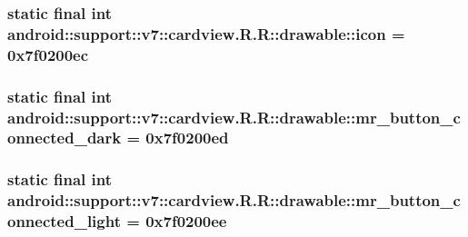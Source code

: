 \hypertarget{classandroid_1_1support_1_1v7_1_1cardview_1_1_r_1_1drawable_9c6ad34a9a64e8ddb2d4bd0702b10056}{
\subsubsection[{icon}]{\setlength{\rightskip}{0pt plus 5cm}static final int android::support::v7::cardview.R.R::drawable::icon = 0x7f0200ec}}
\label{classandroid_1_1support_1_1v7_1_1cardview_1_1_r_1_1drawable_9c6ad34a9a64e8ddb2d4bd0702b10056}


\hypertarget{classandroid_1_1support_1_1v7_1_1cardview_1_1_r_1_1drawable_bc2e2989faf27b8ba32674d74b0dc27a}{
\subsubsection[{mr\_\-button\_\-connected\_\-dark}]{\setlength{\rightskip}{0pt plus 5cm}static final int android::support::v7::cardview.R.R::drawable::mr\_\-button\_\-connected\_\-dark = 0x7f0200ed}}
\label{classandroid_1_1support_1_1v7_1_1cardview_1_1_r_1_1drawable_bc2e2989faf27b8ba32674d74b0dc27a}


\hypertarget{classandroid_1_1support_1_1v7_1_1cardview_1_1_r_1_1drawable_32007ba30dd6b6c5926ca95a58b089c8}{
\subsubsection[{mr\_\-button\_\-connected\_\-light}]{\setlength{\rightskip}{0pt plus 5cm}static final int android::support::v7::cardview.R.R::drawable::mr\_\-button\_\-connected\_\-light = 0x7f0200ee}}
\label{classandroid_1_1support_1_1v7_1_1cardview_1_1_r_1_1drawable_32007ba30dd6b6c5926ca95a58b089c8}


